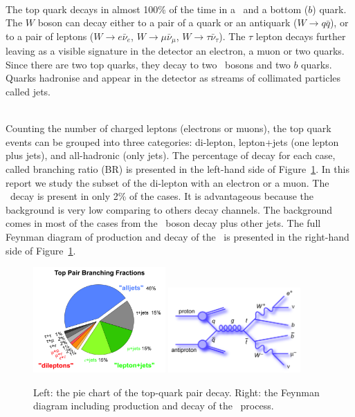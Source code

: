 \ \\The top quark decays in almost 100\% of the time in a \Wboson~and a bottom ($b$) quark. The $W$ boson can decay either to a pair of a quark or an antiquark ($W\rightarrow q\bar{q}$), or to a pair of leptons ($W \rightarrow e\bar{\nu}_e$, $W \rightarrow \mu\bar{\nu}_\mu$, $W \rightarrow \tau\bar{\nu}_\tau$). The $\tau$ lepton decays further leaving as a visible signature in the detector an electron, a muon or two quarks. Since there are two top quarks, they decay to two \Wboson~bosons and two $b$ quarks. Quarks hadronise and appear in the detector as streams of collimated particles called jets. 

\ \\Counting the number of charged leptons (electrons or muons), the top quark events can be grouped into three categories: di-lepton, lepton+jets (one lepton plus jets), and all-hadronic (only jets). The percentage of decay for each case, called branching ratio (BR) is presented in the left-hand side of Figure~\ref{fig:TopQuarkDecay}. In this report we study the subset of the di-lepton with an electron or a muon. The \ttbaremu~decay is present in only 2\% of the cases. It is advantageous because the background is very low comparing to others decay channels. The background comes in most of the cases from the \Zboson~boson decay plus other jets. The full Feynman diagram of production and decay of the \ttbaremu~is presented in the right-hand side of Figure~\ref{fig:TopQuarkDecay}.

\begin{figure}[h]
  \centering
  \includegraphics[width=0.45\textwidth]{../presentation/plots/ttbar_5.png}
  \includegraphics[width=0.45\textwidth]{../presentation/plots/ttbar_4.png}
  \caption{Left: the pie chart of the top-quark pair decay. Right: the Feynman diagram including production and decay of the \ttbaremu~process.}
  \label{fig:TopQuarkDecay}
\end{figure}

\newpage
